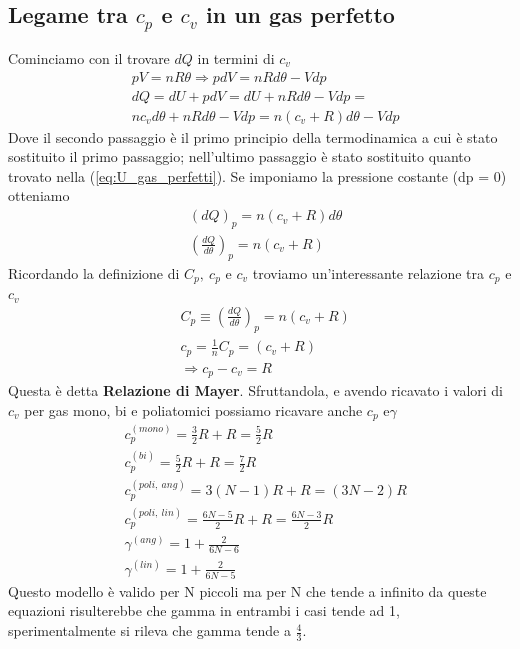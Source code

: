 \documentclass[10pt,a4paper]{article}
\begin{document}
\subsection{Legame tra $c_p$ e $c_v$ in un gas perfetto}
Cominciamo con il trovare \(dQ\) in termini di \(c_v\)
\begin{align}
	&pV = n R \theta \Rightarrow pdV = nRd\theta - Vdp\nonumber \\
	&dQ = dU+pdV = dU + nRd\theta - Vdp =\nonumber\\
	&n c_vd\theta +nRd\theta - Vdp = n(c_v+R)d\theta-Vdp\label{eq:calore_cp}
\end{align}
Dove il secondo passaggio è il primo principio della termodinamica a cui è stato sostituito il primo passaggio; nell'ultimo passaggio è stato sostituito quanto trovato nella (\ref{eq:U_gas_perfetti}). Se imponiamo la pressione costante (dp = 0) otteniamo
\begin{align*}
	&(dQ)_p=n(c_v+R)d\theta\\
	&\left(\frac{dQ}{d\theta}\right)_p = n(c_v+R)
\end{align*}
Ricordando la definizione di \(C_p,\ c_p\) e \(c_v\) troviamo un'interessante relazione tra $c_p$ e $c_v$
\begin{align}\label{eq:relazione_di_Mayer}
	&C_p \equiv \left(\frac{dQ}{d\theta}\right)_p = n(c_v+R)\nonumber\\
	&c_p = \frac{1}{n} C_p = (c_v + R)\nonumber\\
	& \Rightarrow c_p - c_v = R
\end{align}
Questa è detta \textbf{Relazione di Mayer}. Sfruttandola, e avendo ricavato i valori di $c_v$ per gas mono, bi e poliatomici possiamo ricavare anche \(c_p \) e\(\gamma\)
\begin{align*}
	&c_p^{(mono)} = \frac{3}{2}R + R = \frac{5}{2}R\\
	&c_p^{(bi)} = \frac{5}{2}R + R = \frac{7}{2} R\\
	&c_p^{(poli,\ ang)} = 3(N-1)R + R = (3N - 2) R\\
	&c_p^{(poli,\ lin)} =  \frac{6N-5}{2}R + R = \frac{6N-3}{2}R\\
	&\gamma^{(ang)} = 1 + \frac{2}{6 N - 6}\\
	&\gamma^{(lin)} = 1 + \frac{2}{6 N - 5}
\end{align*}
Questo modello è valido per N piccoli ma per N che tende a infinito da queste equazioni risulterebbe che gamma in entrambi i casi tende ad 1, sperimentalmente si rileva che gamma tende a $\frac{4}{3}$.
\end{document}
